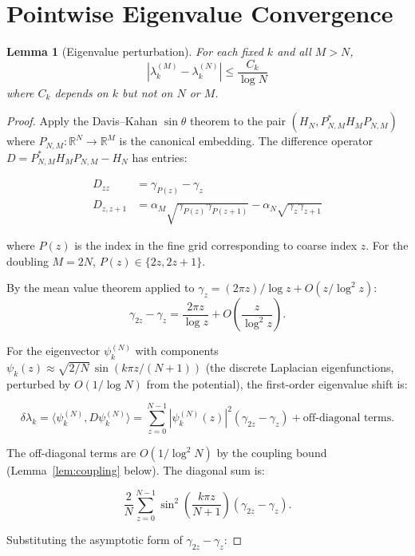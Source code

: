\documentclass[11pt,a4paper]{article}
\newtheorem{lemma}[theorem]{Lemma}
\begin{document}
\section{Pointwise Eigenvalue Convergence}

\begin{lemma}[Eigenvalue perturbation]\label{lem:davis-kahan}
For each fixed $k$ and all $M > N$,
\[
|\lambda_k^{(M)} - \lambda_k^{(N)}| \leq
\frac{C_k}{\log N}
\]
where $C_k$ depends on $k$ but not on $N$ or $M$.
\end{lemma}

\begin{proof}
Apply the Davis--Kahan $\sin\theta$ theorem to the pair
$(H_N, P_{N,M}^* H_M P_{N,M})$ where $P_{N,M}: \mathbb{R}^N \to
\mathbb{R}^M$ is the canonical embedding. The difference operator
$D = P_{N,M}^* H_M P_{N,M} - H_N$ has entries:

\begin{align*}
D_{zz} &= \gamma_{P(z)} - \gamma_z \\
D_{z,z+1} &= \alpha_M \sqrt{\gamma_{P(z)}\gamma_{P(z+1)}} -
             \alpha_N \sqrt{\gamma_z \gamma_{z+1}}
\end{align*}

where $P(z)$ is the index in the fine grid corresponding to coarse
index $z$. For the doubling $M = 2N$, $P(z) \in \{2z, 2z+1\}$.

By the mean value theorem applied to $\gamma_z = (2\pi z)/\log z +
O(z/\log^2 z)$:
\[
\gamma_{2z} - \gamma_z = \frac{2\pi z}{\log z} + O\left(\frac{z}{\log^2 z}\right).
\]

For the eigenvector $\psi_k^{(N)}$ with components
$\psi_k(z) \approx \sqrt{2/N}\,\sin(k\pi z/(N+1))$ (the discrete
Laplacian eigenfunctions, perturbed by $O(1/\log N)$ from the
potential), the first-order eigenvalue shift is:

\begin{equation}\label{eq:shift}
\delta\lambda_k = \langle \psi_k^{(N)}, D \psi_k^{(N)}\rangle
= \sum_{z=0}^{N-1} |\psi_k^{(N)}(z)|^2 (\gamma_{2z} - \gamma_z)
+ \text{off-diagonal terms}.
\end{equation}

The off-diagonal terms are $O(1/\log^2 N)$ by the coupling bound
(Lemma~\ref{lem:coupling} below). The diagonal sum is:

\[
\frac{2}{N}\sum_{z=0}^{N-1} \sin^2\left(\frac{k\pi z}{N+1}\right)
(\gamma_{2z} - \gamma_z).
\]

Substituting the asymptotic form of $\gamma_{2z} - \gamma_z$:


\end{proof}
\end{document}

